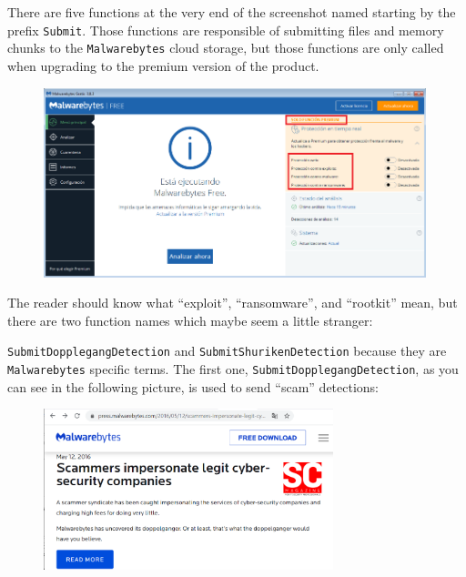 There are five functions at the very end of the screenshot named starting by
the prefix \texttt{Submit}. Those functions are responsible of submitting
files and memory chunks to the \texttt{Malwarebytes} cloud storage, but those
functions are only called when upgrading to the premium version of the
product\cite{MalwarebytesUserGuide}.  
\begin{figure}[h]
  \centering
  \includegraphics[width=0.99\textwidth]{./figures/MalwareBytesFree}
\end{figure}

The reader should know what ``exploit'', ``ransomware'', and ``rootkit'' mean,
but there are two function names which maybe seem a little stranger:

\noindent\texttt{SubmitDopplegangDetection} and \texttt{SubmitShurikenDetection}
because they are \texttt{Malwarebytes} specific terms. The first one,
\texttt{SubmitDopplegangDetection}, as you can see in the following picture,
is used to send ``scam'' detections:
\begin{figure}[h]
  \centering
  \includegraphics[width=0.75\textwidth]{./figures/Scamdetection}
\end{figure}

